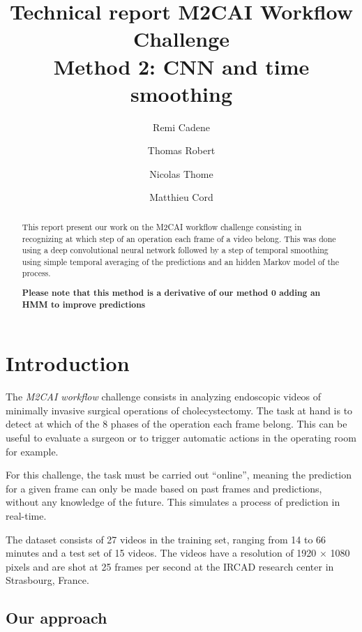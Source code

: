 \documentclass[runningheads,a4paper]{llncs}
\begin{document}
\mainmatter

\title{Technical report M2CAI Workflow Challenge\\Method 2: CNN and time smoothing}

\author{Remi Cadene \and Thomas Robert \and Nicolas Thome \and Matthieu Cord}


\maketitle

\begin{abstract}
This report present our work on the M2CAI workflow challenge consisting in recognizing
at which step of an operation each frame of a video belong. This was done using a
deep convolutional neural network followed by a step of temporal smoothing
using simple temporal averaging of the predictions and an hidden Markov model of the process.

\textbf{Please note that this method is a derivative of our method 0 adding an
HMM to improve predictions}
\end{abstract}

\section{Introduction}

The \emph{M2CAI workflow} challenge consists in analyzing endoscopic videos of
minimally invasive surgical operations of cholecystectomy. The task at hand is
to detect at which of the 8 phases of the operation each frame belong. This can
be useful to evaluate a surgeon or to trigger automatic actions in the operating
room for example.

For this challenge, the task must be carried out ``online'', meaning the prediction
for a given frame can only be made based on past frames and predictions, without
any knowledge of the future. This simulates a process of prediction in real-time.

The dataset consists of 27 videos in the training set, ranging from 14 to 66
minutes and a test set of 15 videos. The videos have a resolution of 1920 $\times$
1080 pixels and are shot at 25 frames per second at the IRCAD research center in
Strasbourg, France.

\subsection{Our approach}
\end{document}

